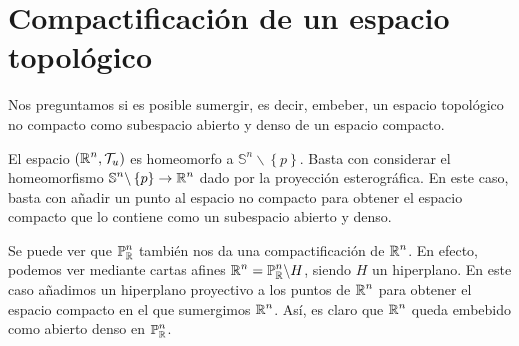 \section{Compactificación de un espacio topológico}
Nos preguntamos si es posible sumergir, es decir, embeber, un espacio topológico no compacto como subespacio abierto y denso de un espacio compacto.
\begin{eg}
	El espacio $\displaystyle \left(\mathbb{R}^{n}, \mathcal{T}_{u}\right) $ es homeomorfo a $\displaystyle \mathbb{S}^{n} \backslash \left\{ p\right\}  $. Basta con considerar el homeomorfismo $\displaystyle \mathbb{S}^{n} \backslash \left\{ p\right\} \to \mathbb{R}^{n} $ dado por la proyección esterográfica.
	En este caso, basta con añadir un punto al espacio no compacto para obtener el espacio compacto que lo contiene como un subespacio abierto y denso.
\end{eg}
\begin{eg}
Se puede ver que $\displaystyle \mathbb{P}^{n}_{\mathbb{R}} $ también nos da una compactificación de $\displaystyle \mathbb{R}^{n} $. En efecto, podemos ver mediante cartas afines $\displaystyle \mathbb{R}^{n} = \mathbb{P}^{n}_{\mathbb{R}}\backslash H $, siendo $\displaystyle H $ un hiperplano. En este caso añadimos un hiperplano proyectivo a los puntos de $\displaystyle \mathbb{R}^{n} $ para obtener el espacio compacto en el que sumergimos $\displaystyle \mathbb{R}^{n} $. 
Así, es claro que $\displaystyle \mathbb{R}^{n} $ queda embebido como abierto denso en $\displaystyle \mathbb{P}^{n}_{\mathbb{R}} $. 
\end{eg}
